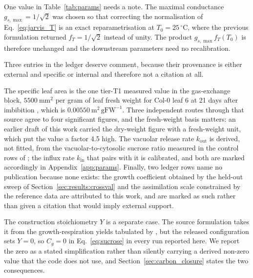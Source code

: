 One value in Table~\ref{tab:params} needs a note. The maximal conductance
$g_{s,\max} = 1/\sqrt{2}$ was chosen so that correcting the normalisation of
Eq.~\eqref{eq:jarvis_T} is an exact reparametrisation at $T_0 = 25\,^\circ$C, where
the previous formulation returned $f_T = 1/\sqrt{2}$ instead of unity. The product
$g_{s,\max} f_T(T_0)$ is therefore unchanged and the downstream parameters need no
recalibration.

Three entries in the ledger deserve comment, because their provenance is either
external and specific or internal and therefore not a citation at all.

The specific leaf area is the one tier-T1 measured value in the gas-exchange
block, $5500~\mathrm{mm^2}$ per gram of leaf fresh weight for Col-0 leaf 6 at 21
days after imbibition \citep{Tolleter2024}, which is
$0.00550~\mathrm{m^2\,gFW^{-1}}$. Three independent routes through that source
agree to four significant figures, and the fresh-weight basis matters: an earlier
draft of this work carried the dry-weight figure with a fresh-weight unit, which
put the value a factor 4.5 high. The vacuolar release rate
$k_{\mathrm{out}}$ is derived, not fitted, from the vacuolar-to-cytosolic sucrose
ratio measured in the control rows of \citet{Seydel2025}; the influx rate
$k_{\mathrm{in}}$ that pairs with it is calibrated, and both are marked
accordingly in Appendix~\ref{app:params}. Finally, two ledger rows name no
publication because none exists: the growth coefficient obtained by the held-out
sweep of Section~\ref{sec:results:crossval} and the assimilation scale
constrained by the reference data are attributed to this work, and are marked as
such rather than given a citation that would imply external support.

The construction stoichiometry $Y$ is a separate case. The source formulation
takes it from the growth-respiration yields tabulated by
\citet{PenningDeVries1989}, but the released configuration sets $Y = 0$, so
$C_g = 0$ in Eq.~\eqref{eq:sucrose} in every run reported here. We report the
zero as a stated simplification rather than silently carrying a derived non-zero
value that the code does not use, and Section~\ref{sec:carbon_closure} states the two
consequences.


